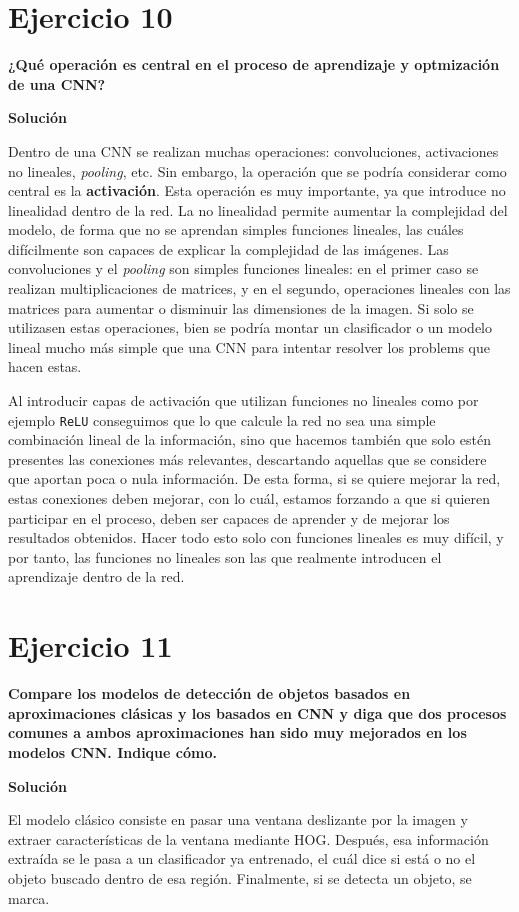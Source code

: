 \documentclass[11pt,a4paper]{article}
\newcommand{\answer}{\noindent\textbf{Solución}}
\newcommand{\question}[1]{\noindent\textbf{#1}}
\newcommand{\nonumsection}[1]{\section*{#1}\addcontentsline{toc}{section}{#1}}
\begin{document}
\nonumsection{Ejercicio 10}

\question{¿Qué operación es central en el proceso de aprendizaje y
optmización de una CNN?}

\answer

Dentro de una CNN se realizan muchas operaciones: convoluciones, activaciones
no lineales, \textit{pooling}, etc. Sin embargo, la operación que se
podría considerar como central es la \textbf{activación}. Esta operación es muy importante,
ya que introduce no linealidad dentro de la red. La no linealidad
permite aumentar la complejidad del modelo, de forma que no se aprendan
simples funciones lineales, las cuáles difícilmente son capaces
de explicar la complejidad de las imágenes. Las convoluciones y
el \textit{pooling} son simples funciones lineales: en el primer caso
se realizan multiplicaciones de matrices, y en el segundo, operaciones
lineales con las matrices para aumentar o disminuir las dimensiones
de la imagen. Si solo se utilizasen estas operaciones, bien se podría
montar un clasificador o un modelo lineal mucho más simple que una CNN
para intentar resolver los problems que hacen estas.

Al introducir capas de activación que utilizan funciones no lineales como
por ejemplo \texttt{ReLU} conseguimos que lo que calcule la red
no sea una simple combinación lineal de la información, sino que hacemos
también que solo estén presentes las conexiones más relevantes, descartando
aquellas que se considere que aportan poca o nula información. De esta forma,
si se quiere mejorar la red, estas conexiones deben mejorar, con lo cuál, estamos
forzando a que si quieren participar en el proceso, deben ser capaces de aprender
y de mejorar los resultados obtenidos. Hacer todo esto solo con funciones lineales
es muy difícil, y por tanto, las funciones no lineales son las que realmente
introducen el aprendizaje dentro de la red.

\nonumsection{Ejercicio 11}

\question{Compare los modelos de detección de objetos basados en
aproximaciones clásicas y los basados en CNN y diga que dos procesos
comunes a ambos aproximaciones han sido muy mejorados en los modelos
CNN. Indique cómo.}

\answer

El modelo clásico consiste en pasar una ventana deslizante por la imagen
y extraer características de la ventana mediante HOG. Después, esa
información extraída se le pasa a un clasificador ya entrenado, el cuál
dice si está o no el objeto buscado dentro de esa región. Finalmente,
si se detecta un objeto, se marca.
\end{document}
